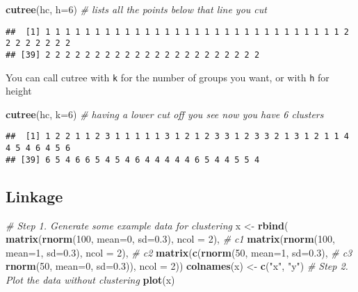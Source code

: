 \documentclass[]{article}
\newenvironment{Shaded}{\begin{snugshade}}{\end{snugshade}}
\newcommand{\CommentTok}[1]{\textcolor[rgb]{0.56,0.35,0.01}{\textit{#1}}}
\newcommand{\DataTypeTok}[1]{\textcolor[rgb]{0.13,0.29,0.53}{#1}}
\newcommand{\DecValTok}[1]{\textcolor[rgb]{0.00,0.00,0.81}{#1}}
\newcommand{\FloatTok}[1]{\textcolor[rgb]{0.00,0.00,0.81}{#1}}
\newcommand{\KeywordTok}[1]{\textcolor[rgb]{0.13,0.29,0.53}{\textbf{#1}}}
\newcommand{\NormalTok}[1]{#1}
\newcommand{\StringTok}[1]{\textcolor[rgb]{0.31,0.60,0.02}{#1}}
\begin{document}
\begin{Shaded}
\begin{Highlighting}[]
\KeywordTok{cutree}\NormalTok{(hc, }\DataTypeTok{h=}\DecValTok{6}\NormalTok{)  }\CommentTok{# lists all the points below that line you cut}
\end{Highlighting}
\end{Shaded}

\begin{verbatim}
##  [1] 1 1 1 1 1 1 1 1 1 1 1 1 1 1 1 1 1 1 1 1 1 1 1 1 1 1 1 1 1 1 2 2 2 2 2 2 2 2
## [39] 2 2 2 2 2 2 2 2 2 2 2 2 2 2 2 2 2 2 2 2 2 2
\end{verbatim}

You can call cutree with \texttt{k} for the number of groups you want,
or with \texttt{h} for height

\begin{Shaded}
\begin{Highlighting}[]
\KeywordTok{cutree}\NormalTok{(hc, }\DataTypeTok{k=}\DecValTok{6}\NormalTok{) }\CommentTok{# having a lower cut off you see now you have 6 clusters}
\end{Highlighting}
\end{Shaded}

\begin{verbatim}
##  [1] 1 2 2 1 1 2 3 1 1 1 1 1 3 1 2 1 2 3 3 1 2 3 3 2 1 3 1 2 1 1 4 4 5 4 6 4 5 6
## [39] 6 5 4 6 6 5 4 5 4 6 4 4 4 4 4 6 5 4 4 5 5 4
\end{verbatim}

\hypertarget{linkage}{%
\subsection{Linkage}\label{linkage}}

\begin{Shaded}
\begin{Highlighting}[]
\CommentTok{# Step 1. Generate some example data for clustering}
\NormalTok{x <-}\StringTok{ }\KeywordTok{rbind}\NormalTok{(}
 \KeywordTok{matrix}\NormalTok{(}\KeywordTok{rnorm}\NormalTok{(}\DecValTok{100}\NormalTok{, }\DataTypeTok{mean=}\DecValTok{0}\NormalTok{, }\DataTypeTok{sd=}\FloatTok{0.3}\NormalTok{), }\DataTypeTok{ncol =} \DecValTok{2}\NormalTok{), }\CommentTok{# c1}
 \KeywordTok{matrix}\NormalTok{(}\KeywordTok{rnorm}\NormalTok{(}\DecValTok{100}\NormalTok{, }\DataTypeTok{mean=}\DecValTok{1}\NormalTok{, }\DataTypeTok{sd=}\FloatTok{0.3}\NormalTok{), }\DataTypeTok{ncol =} \DecValTok{2}\NormalTok{), }\CommentTok{# c2}
 \KeywordTok{matrix}\NormalTok{(}\KeywordTok{c}\NormalTok{(}\KeywordTok{rnorm}\NormalTok{(}\DecValTok{50}\NormalTok{, }\DataTypeTok{mean=}\DecValTok{1}\NormalTok{, }\DataTypeTok{sd=}\FloatTok{0.3}\NormalTok{), }\CommentTok{# c3}
 \KeywordTok{rnorm}\NormalTok{(}\DecValTok{50}\NormalTok{, }\DataTypeTok{mean=}\DecValTok{0}\NormalTok{, }\DataTypeTok{sd=}\FloatTok{0.3}\NormalTok{)), }\DataTypeTok{ncol =} \DecValTok{2}\NormalTok{))}
\KeywordTok{colnames}\NormalTok{(x) <-}\StringTok{ }\KeywordTok{c}\NormalTok{(}\StringTok{"x"}\NormalTok{, }\StringTok{"y"}\NormalTok{)}
\CommentTok{# Step 2. Plot the data without clustering}
\KeywordTok{plot}\NormalTok{(x)}
\end{Highlighting}
\end{Shaded}
\end{document}
